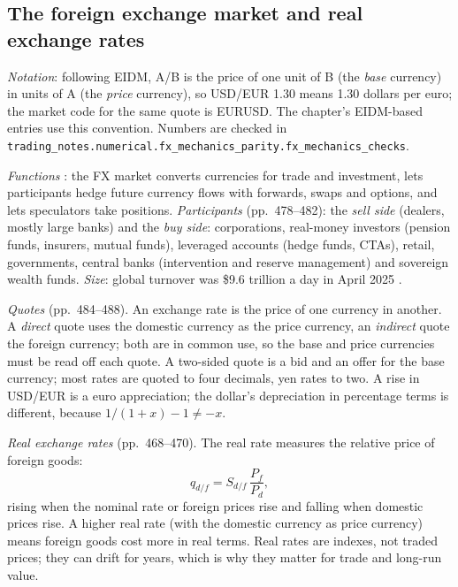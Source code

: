 \subsection{The foreign exchange market and real exchange rates}

\emph{Notation}: following EIDM, A/B is the price of one unit of B (the \emph{base} currency) in units of A (the \emph{price} currency), so USD/EUR 1.30 means 1.30 dollars per euro; the market code for the same quote is EURUSD. The chapter's EIDM-based entries use this convention. Numbers are checked in \nolinkurl{trading_notes.numerical.fx_mechanics_parity.fx_mechanics_checks}.

\begin{qfdefinition}\label{def:fx-market-real-exchange-rates}
 \emph{Functions} \citep[chap.~9, sec.~2, pp.~473--484]{economics-investment-decision-makers-2013}: the FX market converts currencies for trade and investment, lets participants hedge future currency flows with forwards, swaps and options, and lets speculators take positions. \emph{Participants} (pp.~478--482): the \emph{sell side} (dealers, mostly large banks) and the \emph{buy side}: corporations, real-money investors (pension funds, insurers, mutual funds), leveraged accounts (hedge funds, CTAs), retail, governments, central banks (intervention and reserve management) and sovereign wealth funds. \emph{Size}: global turnover was \$9.6 trillion a day in April 2025 \citep[preliminary results]{bis-triennial-2025}.

\emph{Quotes} (pp.~484--488). An exchange rate is the price of one currency in another. A \emph{direct} quote uses the domestic currency as the price currency, an \emph{indirect} quote the foreign currency; both are in common use, so the base and price currencies must be read off each quote. A two-sided quote is a bid and an offer for the base currency; most rates are quoted to four decimals, yen rates to two. A rise in USD/EUR is a euro appreciation; the dollar's depreciation in percentage terms is different, because $1/(1+x)-1\neq-x$.

\emph{Real exchange rates} (pp.~468--470). The real rate measures the relative price of foreign goods:
\[
q_{d/f}=S_{d/f}\,\frac{P_f}{P_d},
\]
rising when the nominal rate or foreign prices rise and falling when domestic prices rise. A higher real rate (with the domestic currency as price currency) means foreign goods cost more in real terms. Real rates are indexes, not traded prices; they can drift for years, which is why they matter for trade and long-run value.


\end{qfdefinition}
